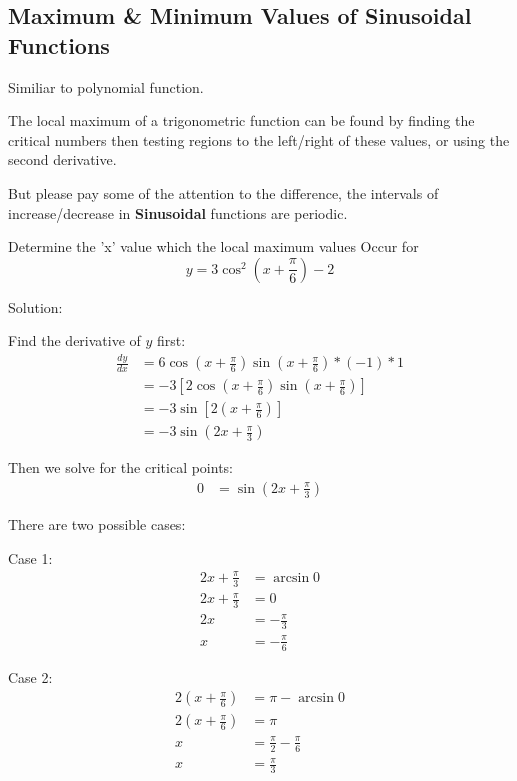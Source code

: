 \subsection{Maximum \& Minimum Values of Sinusoidal Functions}
Similiar to polynomial function. 

The local maximum of a trigonometric function can be found by finding the critical numbers then testing regions to the 
left/right of these values, or using the second derivative. 

But please pay some of the attention to the difference, the intervals of increase/decrease in \textbf{Sinusoidal} functions are periodic. 

\begin{example}
    Determine the 'x' value which the local maximum values Occur for $$y = 3\cos^2 (x + \frac{\pi}{6}) - 2$$

    Solution:

    Find the derivative of $y$ first:
    \begin{align*}
        \frac{dy}{dx} &= 6\cos (x + \frac{\pi}{6}) \sin (x + \frac{\pi}{6}) * (-1) * 1\\
        &= -3 \left[2\cos(x + \frac{\pi}{6})\sin (x + \frac{\pi}{6})\right] \\
        &= -3\sin [2(x + \frac{\pi}{6})]\\
        &= -3 \sin (2x + \frac{\pi}{3})
    \end{align*}

    Then we solve for the critical points:
    \begin{align*}
        0 &= \sin (2x + \frac{\pi}{3})
    \end{align*}

    There are two possible cases:

    Case 1:
    \begin{align*}
        2x + \frac{\pi}{3} &= \arcsin 0\\
        2x + \frac{\pi}{3} &= 0\\
        2x &= -\frac{\pi}{3}\\
        x &= -\frac{\pi}{6}
    \end{align*}

    Case 2:
    \begin{align*}
        2(x + \frac{\pi}{6}) &= \pi - \arcsin 0\\
        2(x + \frac{\pi}{6}) &= \pi\\
        x &= \frac{\pi}{2} - \frac{\pi}{6} \\
        x &= \frac{\pi}{3}
    \end{align*}


\end{example}
